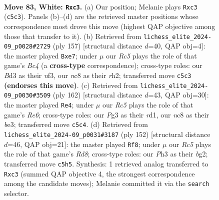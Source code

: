 \documentclass[11pt]{article}
\begin{document}
\clearpage

\begin{figure}[p]\centering
\begin{subfigure}{0.46\textwidth}\centering
\resizebox{\linewidth}{!}{%
\newchessgame
\chessboard[
  setfen={2n3r1/8/P2k4/2R5/3K4/2pB2PP/2P5/8 w - - 5 83},
  showmover=false,
  pgfstyle=straightmove, color=movearrow, markmove={c5-c3}
]}
\caption{}
\end{subfigure}\hfill
\begin{subfigure}{0.46\textwidth}\centering
\resizebox{\linewidth}{!}{%
\newchessgame
\chessboard[
  setfen={4k3/4P3/6p1/2b5/3pK3/p4N2/7R/8 b - - 1 79},
  showmover=false,
  pgfstyle=straightmove, color=movearrow, markmove={c5-e7}
]}
\caption{}
\end{subfigure}
\\[4pt]
\begin{subfigure}{0.46\textwidth}\centering
\resizebox{\linewidth}{!}{%
\newchessgame
\chessboard[
  setfen={8/3k4/4R3/3B1K2/2P2p2/4bP2/8/3r4 w - - 53 82},
  showmover=false,
  pgfstyle=straightmove, color=movearrow, markmove={e6-e4}
]}
\caption{}
\end{subfigure}\hfill
\begin{subfigure}{0.46\textwidth}\centering
\resizebox{\linewidth}{!}{%
\newchessgame
\chessboard[
  setfen={3R4/2k5/8/2K4p/2P4B/1r4P1/6b1/8 w - - 43 77},
  showmover=false,
  pgfstyle=straightmove, color=movearrow, markmove={d8-f8}
]}
\caption{}
\end{subfigure}
\caption{\textbf{Move 83, White: \texttt{Rxc3}.} (a) Our position; Melanie plays \texttt{Rxc3} (\texttt{c5c3}). Panels (b)--(d) are the retrieved master positions whose correspondence most drove this move (highest QAP objective among those that transfer to it). (b) Retrieved from \texttt{lichess\_elite\_2024-09\_p0028\#2729} (ply 157) [structural distance $d$=40, QAP obj=4]: the master played \texttt{Bxe7}; under $\mu$ our \emph{Rc5} plays the role of that game's \emph{Bc4} (a \textbf{cross-type} correspondence); cross-type roles: our \emph{B}d3 as their \emph{n}f3, our \emph{n}c8 as their \emph{r}h2; transferred move \texttt{c5c3} \textbf{(endorses this move)}. (c) Retrieved from \texttt{lichess\_elite\_2024-09\_p0030\#3509} (ply 162) [structural distance $d$=43, QAP obj=30]: the master played \texttt{Re4}; under $\mu$ our \emph{Rc5} plays the role of that game's \emph{Re6}; cross-type roles: our \emph{P}g3 as their \emph{r}d1, our \emph{n}c8 as their \emph{b}e3; transferred move \texttt{c5c4}. (d) Retrieved from \texttt{lichess\_elite\_2024-09\_p0031\#3187} (ply 152) [structural distance $d$=46, QAP obj=21]: the master played \texttt{Rf8}; under $\mu$ our \emph{Rc5} plays the role of that game's \emph{Rd8}; cross-type roles: our \emph{P}h3 as their \emph{b}g2; transferred move \texttt{c5h5}. Synthesis: 1 retrieved analog transferred to \texttt{Rxc3} (summed QAP objective 4, the strongest correspondence among the candidate moves); Melanie committed it via the \texttt{search} selector.}
\label{fig:thought-m164}
\end{figure}
\end{document}

